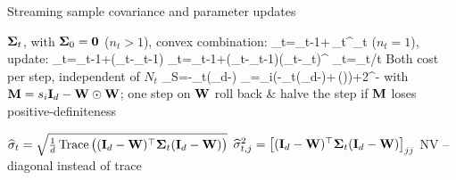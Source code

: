 \documentclass[9pt, aspectratio=169, xcolor=table]{beamer}
\DeclareMathOperator{\Tr}{Trace}
\begin{document}
\begin{frame}[shrink=10]{Streaming sample covariance and parameter updates}

	\bc
	\bi {} $\boldsymbol{\Sigma}_t$, with $\boldsymbol{\Sigma}_0={\mathbf 0}$ \svpos
	\ai {} ($n_t>1$), convex combination:
	\be \bbSigma_t=\bbSigma_{t-1}+\,\widetilde{\bbX}_t^\top\widetilde{\bbX}_t \ee
	\ai {} ($n_t=1$),  update:
	\be \bbmu_t=\bbmu_{t-1}+(\bbx_t-\bbmu_{t-1}) \ee
	\vspace{-4mm}
	\be \bbM_t=\bbM_{t-1}+(\bbx_t-\bbmu_{t-1})(\bbx_t-\bbmu_t)^\top \ee
	\vspace{-4mm}
	\be \bbSigma_t=\bbM_t/t \ee
	\ai Both cost  per step, independent of $N_t$\ei
	\bi {} \svpos
	\be \nabla_{\bbW}S=-\bbSigma_t(\bbI_d-\bbW) \ee
	\be \bbG_{\bbW}=\mu_i\!\left(-\bbSigma_t(\bbI_d-\bbW)+\lambda\,(\bbW)\right)+2\bbW\odot\bbM^{-\top} \ee
	with ${\mathbf M}=s_i{\mathbf I}_d-{\mathbf W}\odot{\ensuremath{\mathbf W}}$; one  step on ${\mathbf W}$ \svpos
	\ai {} roll back \& halve the step if ${\mathbf M}$ loses positive-definiteness\ei \svpos

	\bi {}
	\ai {} $\widehat{\sigma}_t=\sqrt{\tfrac{1}{d}\Tr\big((\bbI_d-\bbW)^\top\bbSigma_t(\bbI_d-\bbW)\big)}$
	\ai {} $\widehat{\sigma}_{t,j}^2=\big[({\mathbf I}_d-{\mathbf W})^\top\boldsymbol{\Sigma}_t({\mathbf I}_d-{\mathbf W})\big]_{jj}$
	\ai NV  -- diagonal instead of trace\ei
	\ec

\end{frame}

\end{document}
